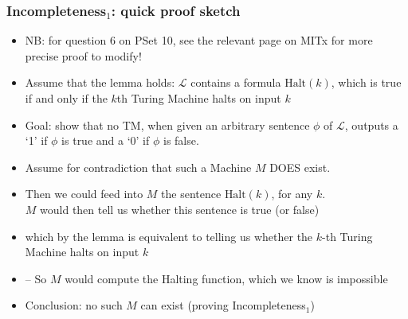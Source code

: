 \begin{frame}
\frametitle{Incompleteness$_1$: quick proof sketch}

\begin{itemize}[<+->]

\item NB: for question 6 on PSet 10, see the relevant page on MITx for more precise proof to modify! 

\item Assume that the lemma holds: $\mathcal{L}$ contains a formula \(\mbox{Halt}(k)\), which is true if and only if the $k$th Turing Machine halts on input \(k\)

\item Goal: show that no TM, when given an arbitrary sentence $\phi$ of $\mathcal{L}$, outputs a `1' if $\phi$ is true and a `0' if $\phi$ is false. 

\item Assume for contradiction that such a Machine $M$ DOES exist. 

\item Then we could feed into $M$ the sentence \(\mbox{Halt}(k)\), for any $k$. \\ $M$ would then tell us whether this sentence is true (or false)
\item[] which by the lemma is equivalent to telling us whether the $k$-th Turing Machine halts on input $k$

\item[] -- So $M$ would compute the Halting function, which we know is impossible

\item Conclusion: no such $M$ can exist (proving Incompleteness$_1$)

\end{itemize}
\end{frame}



